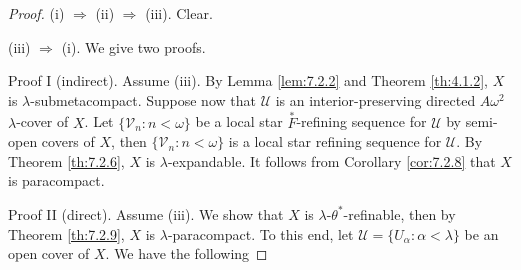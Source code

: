 \documentclass[jisng7iii.tex]{subfiles}
\begin{document}
\begin{proof}
(i) $\Rightarrow$ (ii) $\Rightarrow$ (iii). Clear.

(iii) $\Rightarrow$ (i). We give two proofs.

 Proof I (indirect).  Assume (iii). By Lemma \ref{lem:7.2.2} and Theorem \ref{th:4.1.2},  
 $X$ is $\lambda$-submetacompact. Suppose now that $\mathscr{U}$ is an interior-preserving 
 directed $A\omega^2$ $\lambda$-cover of  $X$. Let $\{\mathscr{V}_n: n < \omega\}$ be a 
 local star $\overset{*}{F}$-refining sequence for $\mathscr{U}$ by semi-open covers of  $X$, 
 then $\{\mathscr{V}_n: n < \omega\}$ is a local star refining sequence for $\mathscr{U}$. 
 By Theorem \ref{th:7.2.6},  $X$ is $\lambda$-expandable. It follows from Corollary \ref{cor:7.2.8} that 
 $X$ is paracompact.

 Proof II (direct).  Assume (iii). We show that  $X$ is $\lambda$-$\theta^*$-refinable, 
 then by Theorem \ref{th:7.2.9},  $X$ is $\lambda$-paracompact. To this end, let 
 $\mathscr{U} = \{U_\alpha: \alpha < \lambda\}$ be an open cover of  $X$. We have the following 
 

\end{proof}
\end{document}
